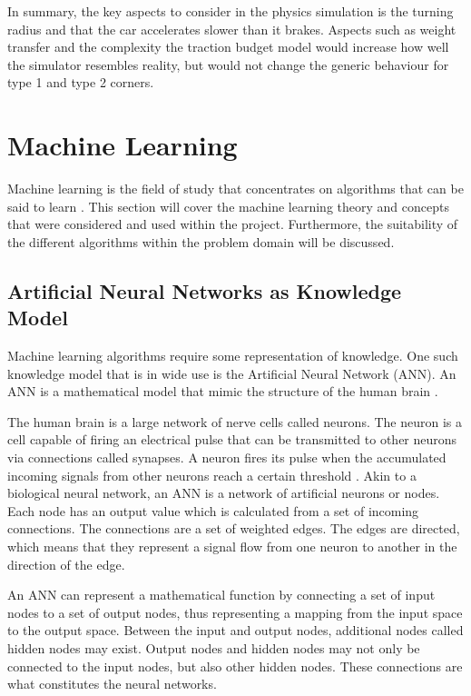 In summary, the key aspects to consider in the physics simulation is the turning radius and that the car accelerates slower than it brakes. Aspects such as weight transfer and the complexity the traction budget model would increase how well the simulator resembles reality, but would not change the generic behaviour for type 1 and type 2 corners. 

\section{Machine Learning}
Machine learning is the field of study that concentrates on algorithms that can be said to learn \cite{glossary}. This section will cover the machine learning theory and concepts that were considered and used within the project. Furthermore, the suitability of the different algorithms within the problem domain will be discussed.  

\subsection{Artificial Neural Networks as Knowledge Model}
Machine learning algorithms require some representation of knowledge. One such knowledge model that is in wide use is the Artificial Neural Network (ANN). An ANN is a mathematical model that mimic the structure of the human brain \cite{haykin}. 

The human brain is a large network of nerve cells called neurons. The neuron is a cell capable of firing an electrical pulse that can be transmitted to other neurons via connections called synapses. A neuron fires its pulse when the accumulated incoming signals from other neurons reach a certain threshold \cite{haykin}. Akin to a biological neural network, an ANN is a network of artificial neurons or nodes. Each node has an output value which is calculated from a set of incoming connections. The connections are a set of weighted edges. The edges are directed, which means that they represent a signal flow from one neuron to another in the direction of the edge.

An ANN can represent a mathematical function by connecting a set of input nodes to a set of output nodes, thus representing a mapping from the input space to the output space. Between the input and output nodes, additional nodes called hidden nodes may exist. Output nodes and hidden nodes may not only be connected to the input nodes, but also other hidden nodes. These connections are what constitutes the neural networks. 

